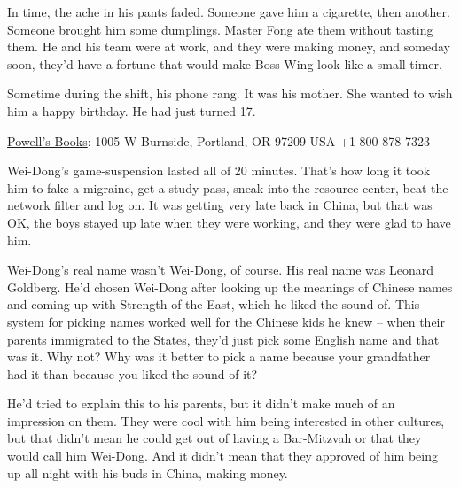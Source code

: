 In time, the ache in his pants faded. Someone gave him a cigarette,
then another. Someone brought him some dumplings. Master Fong ate
them without tasting them. He and his team were at work, and they
were making money, and someday soon, they'd have a fortune that
would make Boss Wing look like a small-timer.

Sometime during the shift, his phone rang. It was his mother. She
wanted to wish him a happy birthday. He had just turned 17.

\tb

{\href{http://www.powells.com/cgi-bin/biblio?isbn=9780765322166}{Powell's Books}: 1005 W Burnside, Portland, OR 97209 USA +1 800 878 7323}

Wei-Dong's game-suspension lasted all of 20 minutes. That's how
long it took him to fake a migraine, get a study-pass, sneak into
the resource center, beat the network filter and log on. It was
getting very late back in China, but that was OK, the boys stayed
up late when they were working, and they were glad to have him.

Wei-Dong's real name wasn't Wei-Dong, of course. His real name was
Leonard Goldberg. He'd chosen Wei-Dong after looking up the
meanings of Chinese names and coming up with Strength of the East,
which he liked the sound of. This system for picking names worked
well for the Chinese kids he knew -- when their parents immigrated
to the States, they'd just pick some English name and that was it.
Why not? Why was it better to pick a name because your grandfather
had it than because you liked the sound of it?

He'd tried to explain this to his parents, but it didn't make much
of an impression on them. They were cool with him being interested
in other cultures, but that didn't mean he could get out of having
a Bar-Mitzvah or that they would call him Wei-Dong. And it didn't
mean that they approved of him being up all night with his buds in
China, making money.

